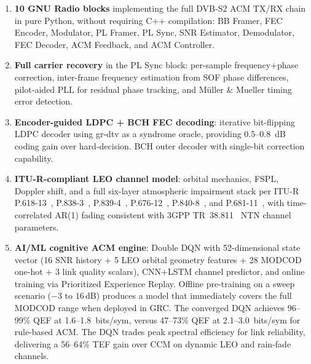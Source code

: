 \documentclass[12pt,a4paper]{report}
\begin{document}
\begin{enumerate}
    \item \textbf{10 GNU Radio blocks} implementing the full DVB-S2 ACM TX/RX
          chain in pure Python, without requiring C++ compilation:
          BB Framer, FEC Encoder, Modulator, PL Framer, PL Sync, SNR Estimator,
          Demodulator, FEC Decoder, ACM Feedback, and ACM Controller.

    \item \textbf{Full carrier recovery} in the PL Sync block: per-sample
          frequency+phase correction, inter-frame frequency estimation from
          SOF phase differences, pilot-aided PLL for residual phase tracking,
          and Müller \& Mueller timing error detection.

    \item \textbf{Encoder-guided LDPC + BCH FEC decoding}: iterative
          bit-flipping LDPC decoder using gr-dtv as a syndrome oracle, providing
          0.5--0.8~dB coding gain over hard-decision. BCH outer decoder with
          single-bit correction capability.

    \item \textbf{ITU-R-compliant LEO channel model}: orbital mechanics, FSPL,
          Doppler shift, and a full six-layer atmospheric impairment stack
          per ITU-R P.618-13~\cite{itu_p618}, P.838-3~\cite{itu_p838},
          P.839-4~\cite{itu_p839}, P.676-12~\cite{itu_p676},
          P.840-8~\cite{itu_p840}, and P.681-11~\cite{itu_p681}, with
          time-correlated AR(1) fading consistent with 3GPP
          TR~38.811~\cite{3gpp_tr38811} NTN channel parameters.

    \item \textbf{AI/ML cognitive ACM engine}: Double DQN with 52-dimensional
          state vector (16 SNR history + 5 LEO orbital geometry features +
          28 MODCOD one-hot + 3 link quality scalars), CNN+LSTM channel
          predictor, and online training via Prioritized Experience Replay.
          Offline pre-training on a sweep scenario ($-3$ to $16$\,dB) produces
          a model that immediately covers the full MODCOD range when deployed
          in GRC.  The converged DQN achieves 96--99\% QEF at 1.6--1.8~bits/sym,
          versus 47--73\% QEF at 2.1--3.0~bits/sym for rule-based ACM.
          The DQN trades peak spectral efficiency for link reliability, delivering
          a 56--64\% TEF gain over CCM on dynamic LEO and rain-fade channels.
\end{enumerate}
\end{document}
